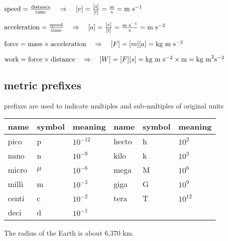 \newpage

\begin{soln}
 $\text{speed} = \frac{\text{distance}}{\text{time}} \quad \Rightarrow \quad [v] = \frac{[s]}{[t]} = \frac{\text{m}}{\text{s}} = \text{m s}^{-1}$
	\end{soln}
 \begin{soln}
	$\text{acceleration} = \frac{\text{speed}}{\text{time}} \quad \Rightarrow \quad [a] = \frac{[v]}{[t]} = \frac{\text{m s}^{-1}}{\text{s}} = \text{m s}^{-2}$ 
\end{soln}
 \begin{soln}
	$\text{force} = \text{mass} \times \text{acceleration} \quad \Rightarrow \quad [F] = [m][a] = \text{kg}\text{ m s$^{-2}$} $ 
	\end{soln}
 \begin{soln}
	$\text{work} = \text{force} \times \text{distance} \quad \Rightarrow \quad [W] = [F][s] = \text{kg}\text{ m s$^{-2}$} \times \text{m} = \text{kg m}^2 \text{s}^{-2}$ 
\end{soln}


\subsection{metric prefixes}

prefixes are used to indicate multiples and sub-multiples of original units

\begin{center}
	\begin{tabular}{|C{1.8cm}|C{1.8cm}|C{1.8cm}||C{1.8cm}|C{1.8cm}|C{1.8cm}|}
		\hline name & symbol & meaning & name & symbol & meaning \\ 
		\hline pico & p & $10^{-12}$ & hecto & h & $10^{2}$\\ 
		\hline nano & n & $10^{-9}$ & kilo & k & $10^{3}$\\ 
		\hline micro & $\mu$ & $10^{-6}$ & mega & M & $10^{6}$\\ 
		\hline milli & m & $10^{-3}$ & giga & G & $10^{9}$\\ 
		\hline centi & c & $10^{-2}$ & tera & T & $10^{12}$\\ 
		\hline deci & d & $10^{-1}$ & & &\\ 
		\hline 
	\end{tabular} 
\end{center}


	The radius of the Earth is about 6,370 km.
	
